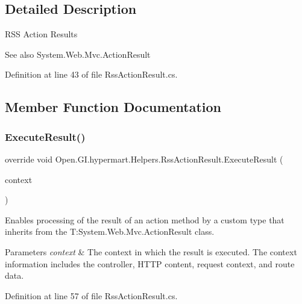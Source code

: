 \subsection{Detailed Description}
R\+SS Action Results 

\begin{DoxySeeAlso}{See also}
System.\+Web.\+Mvc.\+Action\+Result


\end{DoxySeeAlso}


Definition at line 43 of file Rss\+Action\+Result.\+cs.



\subsection{Member Function Documentation}
\mbox{\label{class_open_1_1_g_i_1_1hypermart_1_1_helpers_1_1_rss_action_result_a18ff30f679b2858b2d88a7dc267fd672}} 
\subsubsection{Execute\+Result()}
{\footnotesize\ttfamily override void Open.\+G\+I.\+hypermart.\+Helpers.\+Rss\+Action\+Result.\+Execute\+Result (\begin{DoxyParamCaption}\item[{Controller\+Context}]{context }\end{DoxyParamCaption})}



Enables processing of the result of an action method by a custom type that inherits from the T\+:\+System.\+Web.\+Mvc.\+Action\+Result class. 


\begin{DoxyParams}{Parameters}
{\em context} & The context in which the result is executed. The context information includes the controller, H\+T\+TP content, request context, and route data.\\
\hline
\end{DoxyParams}


Definition at line 57 of file Rss\+Action\+Result.\+cs.



